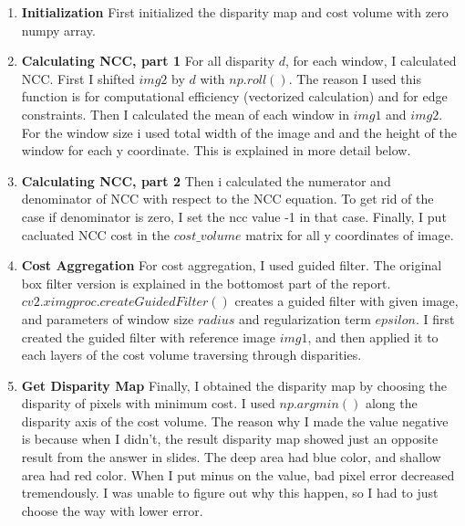 \begin{enumerate}
    \item \textbf{Initialization} First initialized the disparity map and cost volume with zero numpy array. 
    \item \textbf{Calculating NCC, part 1} For all disparity $d$, for each window, I calculated NCC. First I shifted $img2$ by $d$ with $np.roll()$. The reason I used this function is for computational efficiency (vectorized calculation) and for edge constraints. 
    Then I calculated the mean of each window in $img1$ and $img2$. For the window size i used total width of the image and and the height of the window for each y coordinate. This is explained in more detail below.
    \item \textbf{Calculating NCC, part 2} Then i calculated the numerator and denominator of NCC with respect to the NCC equation. To get rid of the case if denominator is zero, I set the ncc value -1 in that case. Finally, I put cacluated NCC cost in the $cost\_volume$ matrix for all y coordinates of image.
    \item \textbf{Cost Aggregation} For cost aggregation, I used guided filter. The original box filter version is explained in the bottomost part of the report. $cv2.ximgproc.createGuidedFilter()$ creates a guided filter with given image, and parameters of window size $radius$ and regularization term $epsilon$. I first created the guided filter with reference image $img1$, and then applied it to each layers of the cost volume traversing through disparities.
    \item \textbf{Get Disparity Map} Finally, I obtained the disparity map by choosing the disparity of pixels with minimum cost. I used $np.argmin()$ along the disparity axis of the cost volume. The reason why I made the value negative is because when I didn't, the result disparity map showed just an opposite result from the answer in slides. The deep area had blue color, and shallow area had red color. When I put minus on the value, bad pixel error decreased tremendously. I was unable to figure out why this happen, so I had to just choose the way with lower error. 
\end{enumerate}

